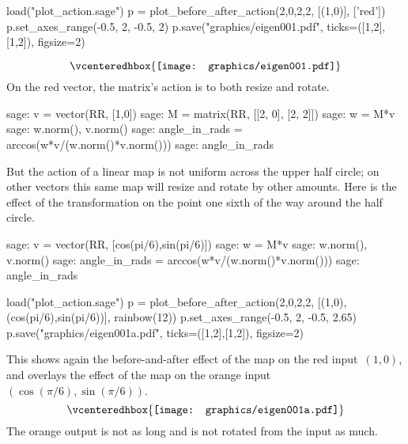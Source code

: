 \begin{sagesilent}
load("plot_action.sage")  
p = plot_before_after_action(2,0,2,2, [(1,0)], ['red']) 
p.set_axes_range(-0.5, 2, -0.5, 2) 
p.save("graphics/eigen001.pdf", ticks=([1,2],[1,2]), figsize=2)
\end{sagesilent}
\begin{equation*}
  \vcenteredhbox{\texttt{[image: graphics/eigen001.pdf]}}
\end{equation*}
On the red vector, the matrix's action is to both resize and rotate.
\begin{sagecommandline}
sage: v = vector(RR, [1,0])
sage: M = matrix(RR, [[2, 0], [2, 2]])
sage: w = M*v
sage: w.norm(), v.norm() 
sage: angle_in_rads = arccos(w*v/(w.norm()*v.norm())) 
sage: angle_in_rads 
\end{sagecommandline}
But the action of a linear map is not uniform across the upper half circle; on
other vectors this same map will resize and rotate by other
amounts.
Here is the effect of the transformation on the point
one sixth of the way around the half circle.
\begin{sagecommandline}
sage: v = vector(RR, [cos(pi/6),sin(pi/6)])
sage: w = M*v
sage: w.norm(), v.norm() 
sage: angle_in_rads = arccos(w*v/(w.norm()*v.norm())) 
sage: angle_in_rads 
\end{sagecommandline}
\begin{sagesilent}
load("plot_action.sage")  
p = plot_before_after_action(2,0,2,2, [(1,0), (cos(pi/6),sin(pi/6))], rainbow(12)) 
p.set_axes_range(-0.5, 2, -0.5, 2.65) 
p.save("graphics/eigen001a.pdf", ticks=([1,2],[1,2]), figsize=2)
\end{sagesilent}
This shows again the before-and-after effect of the map on the red 
input~$(1,0)$, 
and overlays the effect of the map on the orange 
input~$(\cos(\pi/6),\sin(\pi/6))$. 
\begin{equation*}
  \vcenteredhbox{\texttt{[image: graphics/eigen001a.pdf]}}
\end{equation*}
The orange output is not as long and is not rotated from the input as much.

